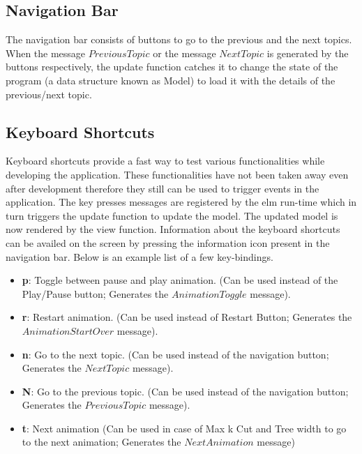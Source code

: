 \subsection{Navigation Bar}
The navigation bar consists of buttons to go to the previous and the next
topics.  When the message $PreviousTopic$ or the message $NextTopic$ is
generated by the buttons respectively, the update function catches it to change
the state of the program (a data structure known as Model) to load it with the
details of the previous/next topic.

\subsection{Keyboard Shortcuts}
Keyboard shortcuts provide a fast way to test various functionalities while
developing the application.  These functionalities have not been taken away
even after development therefore they still can be used to trigger events in
the application. 
The key presses messages are registered by the elm run-time which in turn
triggers the update function to update the model. The updated model is now
rendered by the view function. Information about the keyboard shortcuts can be
availed on the screen by pressing the information icon present in the
navigation bar. Below is an example list of a few key-bindings.

\begin{itemize}
\item \textbf{p}: Toggle between pause and play animation. (Can be used instead of the Play/Pause button; Generates the $AnimationToggle$ message). \\
\item \textbf{r}: Restart animation. (Can be used instead of Restart Button; Generates the $AnimationStartOver$ message). \\
\item \textbf{n}: Go to the next topic. (Can be used instead of the navigation button; Generates the $NextTopic$ message). \\
\item \textbf{N}: Go to the previous topic. (Can be used instead of the navigation button; Generates the $PreviousTopic$ message). \\
\item \textbf{t}: Next animation (Can be used in case of Max k Cut and Tree width to go to the next animation; Generates the $NextAnimation$ message)
\end{itemize}


